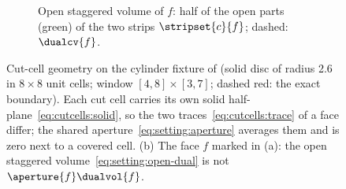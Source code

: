 \begin{figure}
\begin{subfigure}[b]{0.56\textwidth}
    \label{fig:cutcells:apertures:traces}
  \end{subfigure}%
  \hfill
  \begin{subfigure}[b]{0.41\textwidth}
    \centering
    \caption{Open staggered volume of $f$: half of the open parts (green) of
      the two strips $\stripset{c}{f}$; dashed: $\dualcv{f}$.}
    \label{fig:cutcells:apertures:dual}
  \end{subfigure}
  \caption{Cut-cell geometry on the cylinder fixture of 
    (solid disc of radius 2.6 in $8\times8$ unit cells; window
    $[4,8]\times[3,7]$; dashed red: the exact boundary). Each cut
    cell carries its own solid half-plane~\cref{eq:cutcells:solid}, so the two
    traces~\cref{eq:cutcells:trace} of a face differ; the shared
    aperture~\cref{eq:setting:aperture} averages them and is zero next to a
    covered cell. (b) The face $f$ marked in (a): the open staggered
    volume~\cref{eq:setting:open-dual} is not $\aperture{f}\dualvol{f}$.}
  \label{fig:cutcells:apertures}
\end{figure}

